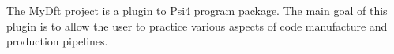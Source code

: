 The My\+Dft project is a plugin to Psi4 program package. The main goal of this plugin is to allow the user to practice various aspects of code manufacture and production pipelines. 